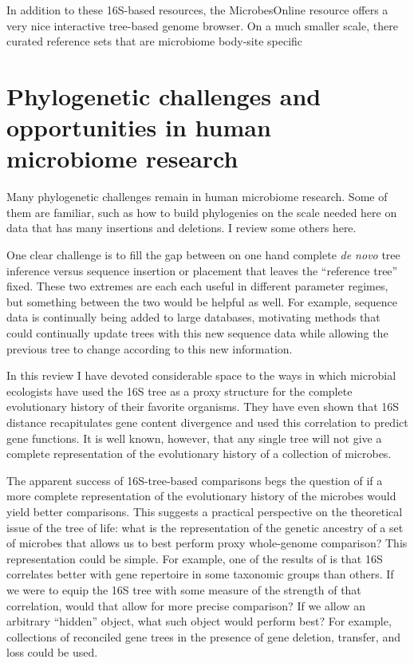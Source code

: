 \documentclass{amsart}
\begin{document}
In addition to these 16S-based resources, the MicrobesOnline resource \citep{dehal2010microbesonline} offers a very nice interactive tree-based genome browser.
On a much smaller scale, there curated reference sets that are microbiome body-site specific \citep{chen2010human,griffen2011core,srinivasan2012bacterial}



\section{Phylogenetic challenges and opportunities in human microbiome research}

Many phylogenetic challenges remain in human microbiome research.
Some of them are familiar, such as how to build phylogenies on the scale needed here on data that has many insertions and deletions.
I review some others here.

One clear challenge is to fill the gap between on one hand complete \emph{de novo} tree inference versus sequence insertion or placement that leaves the ``reference tree'' fixed.
These two extremes are each each useful in different parameter regimes, but something between the two would be helpful as well.
For example, sequence data is continually being added to large databases, motivating methods that could continually update trees with this new sequence data while allowing the previous tree to change according to this new information.

In this review I have devoted considerable space to the ways in which microbial ecologists have used the 16S tree as a proxy structure for the complete evolutionary history of their favorite organisms.
They have even shown that 16S distance recapitulates gene content divergence and used this correlation to predict gene functions.
It is well known, however, that any single tree will not give a complete representation of the evolutionary history of a collection of microbes.

The apparent success of 16S-tree-based comparisons begs the question of if a more complete representation of the evolutionary history of the microbes would yield better comparisons.
This suggests a practical perspective on the theoretical issue of the tree of life: what is the representation of the genetic ancestry of a set of microbes that allows us to best perform proxy whole-genome comparison?
This representation could be simple.
For example, one of the results of \citet{zaneveld2010ribosomal} is that 16S correlates better with gene repertoire in some taxonomic groups than others.
If we were to equip the 16S tree with some measure of the strength of that correlation, would that allow for more precise comparison?
If we allow an arbitrary ``hidden'' object, what such object would perform best?
For example, collections of reconciled gene trees in the presence of gene deletion, transfer, and loss \citep[see][for interesting recent results]{szollHosi2013efficient,szollHosi2013lateral} could be used.
\end{document}
